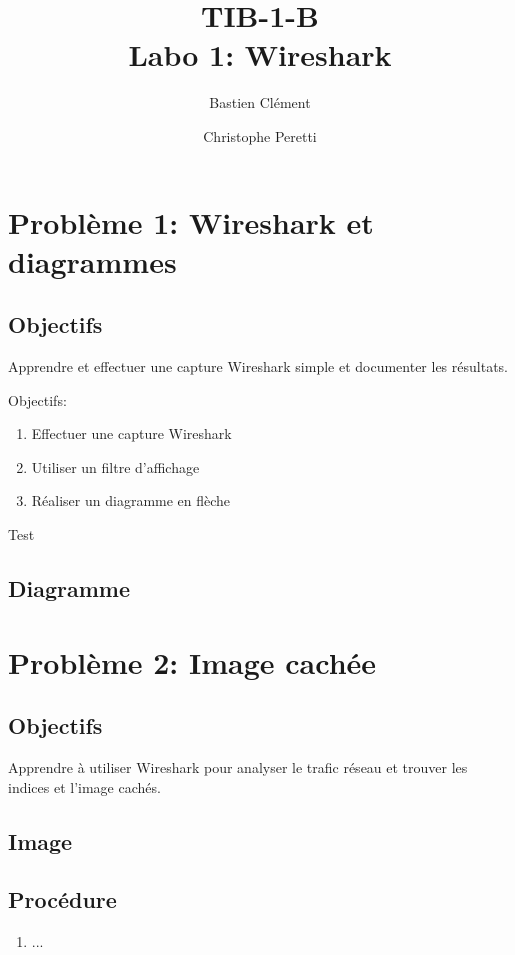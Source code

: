 \documentclass[11pt,a4paper]{article}
\title{TIB-1-B \\ Labo 1: Wireshark}
\author{Bastien Clément \and Christophe Peretti}
\begin{document}
\maketitle

\section*{Problème 1: Wireshark et diagrammes}

\subsection{Objectifs}
Apprendre et effectuer une capture Wireshark simple et documenter les résultats.

Objectifs:

\begin{enumerate}
  \item Effectuer une capture Wireshark
  \item Utiliser un filtre d'affichage
  \item Réaliser un diagramme en flèche
\end{enumerate}

Test

\subsection{Diagramme}

\section*{Problème 2: Image cachée}

\subsection{Objectifs}

Apprendre à utiliser Wireshark pour analyser le trafic réseau et trouver les indices et l'image cachés.

\subsection{Image}

\subsection{Procédure}

\begin{enumerate}
  \item ...
\end{enumerate}
\end{document}
